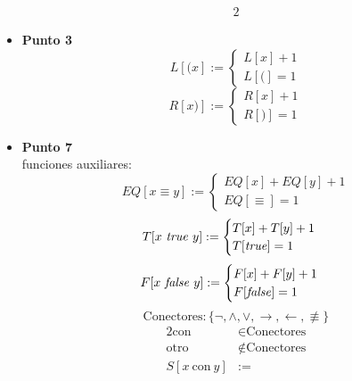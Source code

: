 \documentclass{article}
\begin{document}
\begin{itemize}
\begin{alignat*}{2}
	      \end{alignat*}
	\item \textbf{Punto 3}
	      \begin{equation*}
		      L[(x] :=
		      \begin{cases}
			      L[x] + 1 \\
			      L[(] = 1
		      \end{cases}
	      \end{equation*}
	      \begin{equation*}
		      R[x)] :=
		      \begin{cases}
			      R[x] + 1 \\
			      R[)] = 1
		      \end{cases}
	      \end{equation*}
	\item \textbf{Punto 7}\\
	      funciones auxiliares:
	      \begin{equation*}
		      EQ[x \equiv y] :=
		      \begin{cases}
			      EQ[x] + EQ[y] + 1 \\
			      EQ[\equiv] = 1
		      \end{cases}
	      \end{equation*}
	      \begin{equation*}
		      T[x\ \textrm{\textit{true}}\ y] :=
		      \begin{cases}
			      T[x] + T[y] + 1 \\
			      T[\textrm{\textit{true}}] = 1
		      \end{cases}
	      \end{equation*}
	      \begin{equation*}
		      F[x \ \textrm{\textit{false}}\  y] :=
		      \begin{cases}
			      F[x] + F[y] + 1 \\
			      F[\textrm{\textit{false}}] = 1
		      \end{cases}
	      \end{equation*}
	      \begin{equation*}
		      \textrm{Conectores} : \{\lnot, \wedge, \vee, \to, \gets, \not\equiv\}
	      \end{equation*}
	      \begin{alignat*}{2}
		      \textrm{con}          & \in \textrm{Conectores} \\
			  \textrm{otro} & \notin \textrm{Conectores} \\[0.5cm]	
		      S[x\ \textrm{con}\ y] & :=

\end{alignat*}
\end{itemize}
\end{document}
